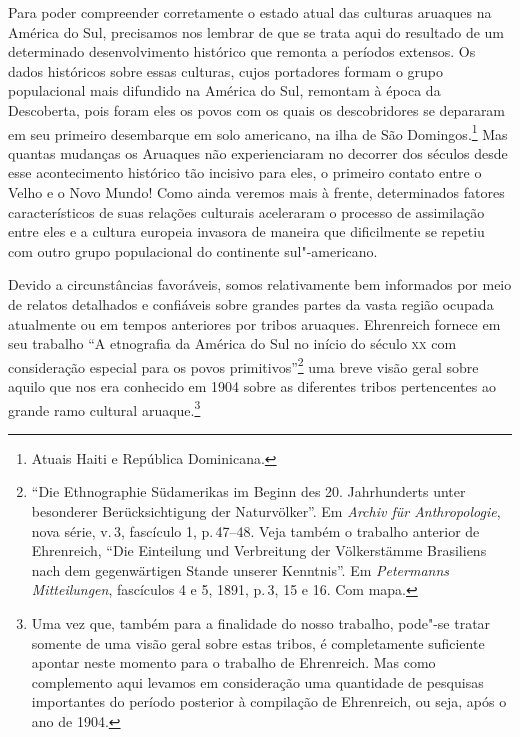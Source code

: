 Para poder compreender corretamente o estado atual das culturas aruaques
na América do Sul, precisamos nos lembrar de que se trata aqui do
resultado de um determinado desenvolvimento histórico que remonta a
períodos extensos. Os dados históricos sobre essas culturas, cujos
portadores formam o grupo populacional mais difundido na América do Sul,
remontam à época da Descoberta, pois foram eles os povos com os quais os
descobridores se depararam em seu primeiro desembarque em solo americano,
na ilha de São Domingos.\footnote{Atuais Haiti e República Dominicana.} Mas quantas mudanças os Aruaques não experienciaram no
decorrer dos séculos desde esse acontecimento histórico tão incisivo
para eles, o primeiro contato entre o Velho e o Novo Mundo! Como ainda veremos mais à frente,
determinados fatores característicos de suas relações culturais
aceleraram o processo de assimilação entre eles e a cultura europeia
invasora de maneira que dificilmente se repetiu com outro grupo
populacional do continente sul"-americano.

Devido a circunstâncias favoráveis, somos relativamente bem informados
por meio de relatos detalhados e confiáveis sobre grandes partes da
vasta região ocupada atualmente ou em tempos anteriores por tribos
aruaques. Ehrenreich fornece em seu trabalho ``A etnografia da América do Sul no
início do século \textsc{xx} com consideração especial para os povos
primitivos''\footnote{``Die Ethnographie
Südamerikas im Beginn des 20. Jahrhunderts unter besonderer
Berücksichtigung der Naturvölker''. Em \textit{Archiv für Anthropologie}, nova série,
  v.\,3, fascículo 1, p.\,47--48. Veja também o trabalho anterior de
  Ehrenreich, ``Die Einteilung und Verbreitung der Völkerstämme
  Brasiliens nach dem gegenwärtigen Stande unserer Kenntnis''. Em \textit{Petermanns Mitteilungen},
  fascículos 4 e 5, 1891, p.\,3, 15 e 16. Com mapa.} uma breve visão
geral sobre aquilo que nos era conhecido em 1904 sobre as diferentes
tribos pertencentes ao grande ramo cultural aruaque.\footnote{Uma vez que, também
para a finalidade do nosso trabalho, pode"-se tratar somente de uma
visão geral sobre estas tribos, é completamente suficiente apontar neste
momento para o trabalho de Ehrenreich. Mas como complemento aqui
levamos em consideração uma quantidade de pesquisas importantes do
período posterior à compilação de Ehrenreich, ou seja, após o ano de
1904.}

